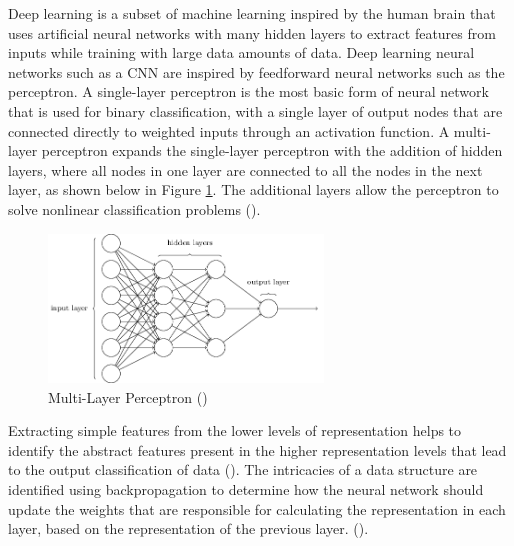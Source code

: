 Deep learning is a subset of machine learning inspired by the human brain that uses artificial neural networks with many hidden layers to extract features from inputs while training with large data amounts of data. %
Deep learning neural networks such as a \acrfull{CNN} are inspired by feedforward neural networks such as the perceptron. A single-layer perceptron is the most basic form of neural network that is used for binary classification, with a single layer of output nodes that are connected directly to weighted inputs through an activation function. A multi-layer perceptron expands the single-layer perceptron with the addition of hidden layers, where all nodes in one layer are connected to all the nodes in the next layer, as shown below in Figure \ref{fig:perceptron_multi}. The additional layers allow the perceptron to solve nonlinear classification problems (\cite{driss_comparison_2017}).

\begin{figure}[ht!]
\centering
\includegraphics[width=0.65\textwidth]{media/literature/machine_learning/ml_perceptron_multi.png}
\caption[Diagram of a multi-layer perceptron]{Multi-Layer Perceptron (\cite{michael_perceptron_2019})}
\label{fig:perceptron_multi}
\end{figure}


Extracting simple features from the lower levels of representation helps to identify the abstract features present in the higher representation levels that lead to the output classification of data (\cite{bengio_deep_2011}).
%
The intricacies of a data structure are identified using backpropagation to determine how the neural network should update the weights that are responsible for calculating the representation in each layer, based on the representation of the previous layer. (\cite{lecun_deep_2015}).


